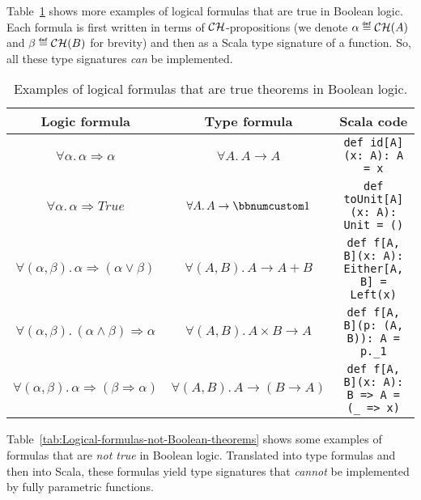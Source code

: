 Table~\ref{tab:Logical-formulas-Boolean-theorems} shows more examples
of logical formulas that are true in Boolean logic. Each formula is
first written in terms of ${\cal CH}$-propositions (we denote $\alpha\triangleq{\cal CH}(A)$
and $\beta\triangleq{\cal CH}(B)$ for brevity) and then as a Scala
type signature of a function. So, all these type signatures \emph{can}
be implemented.

\begin{table}[h]
\begin{centering}
\begin{tabular}{|c|c|c|}
\hline 
\textbf{\small{}Logic formula} & \textbf{\small{}Type formula} & \textbf{\small{}Scala code}\tabularnewline
\hline 
\hline 
{\footnotesize{}$\forall\alpha.\,\alpha\Rightarrow\alpha$} & {\footnotesize{}$\forall A.\,A\rightarrow A$} & \lstinline!def id[A](x: A): A = x!\tabularnewline
\hline 
{\footnotesize{}$\forall\alpha.\,\alpha\Rightarrow True$} & {\footnotesize{}$\forall A.\,A\rightarrow\bbnum 1$} & \lstinline!def toUnit[A](x: A): Unit = ()!\tabularnewline
\hline 
{\footnotesize{}$\forall(\alpha,\beta).\,\alpha\Rightarrow(\alpha\vee\beta)$} & {\footnotesize{}$\forall(A,B).\,A\rightarrow A+B$} & \lstinline!def f[A, B](x: A): Either[A, B] = Left(x)!\tabularnewline
\hline 
{\footnotesize{}$\forall(\alpha,\beta).\,(\alpha\wedge\beta)\Rightarrow\alpha$} & {\footnotesize{}$\forall(A,B).\,A\times B\rightarrow A$} & \lstinline!def f[A, B](p: (A, B)): A = p._1!\tabularnewline
\hline 
{\footnotesize{}$\forall(\alpha,\beta).\,\alpha\Rightarrow(\beta\Rightarrow\alpha)$} & {\footnotesize{}$\forall(A,B).\,A\rightarrow(B\rightarrow A)$} & \lstinline!def f[A, B](x: A): B => A = (_ => x)!\tabularnewline
\hline 
\end{tabular}
\par\end{centering}
\caption{Examples of logical formulas that are true theorems in Boolean logic.\label{tab:Logical-formulas-Boolean-theorems}}
\end{table}

Table~\ref{tab:Logical-formulas-not-Boolean-theorems} shows some
examples of formulas that are \emph{not true} in Boolean logic. Translated
into type formulas and then into Scala, these formulas yield type
signatures that \emph{cannot} be implemented by fully parametric functions.

